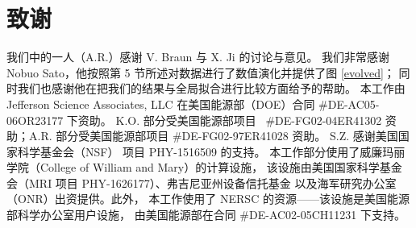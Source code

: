 \section*{致谢}

我们中的一人（A.R.）感谢 V. Braun 与 X. Ji 的讨论与意见。
我们非常感谢 Nobuo Sato，他按照第 5 节所述对数据进行了数值演化并提供了图 \ref{evolved}；
同时我们也感谢他在把我们的结果与全局拟合进行比较方面给予的帮助。
本工作由 Jefferson Science Associates,
 LLC 在美国能源部（DOE）合同 \#DE-AC05-06OR23177 下资助。
 K.O. 部分受美国能源部项目
\mbox{ \#DE-FG02-04ER41302} 资助；A.R. 部分受美国能源部项目
 \mbox{\#DE-FG02-97ER41028} 资助。
 S.Z. 感谢美国国家科学基金会（NSF）
项目 PHY-1516509 的支持。
 本工作部分使用了威廉玛丽学院（College of William and Mary）的计算设施，
 该设施由美国国家科学基金会（MRI 项目 PHY-1626177）、弗吉尼亚州设备信托基金
 以及海军研究办公室（ONR）出资提供。此外，
 本工作使用了 NERSC 的资源——该设施是美国能源部科学办公室用户设施，
 由美国能源部在合同 \#DE-AC02-05CH11231 下支持。

